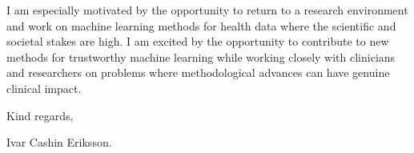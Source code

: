 \documentclass[11pt,a4paper]{moderncv}
\begin{document}
\hspace*{2em}
I am especially motivated by the opportunity to return to a research environment and work on machine learning methods for health data where the scientific and societal stakes are high. I am excited by the opportunity to contribute to new methods for trustworthy machine learning while working closely with clinicians and researchers on problems where methodological advances can have genuine clinical impact.

\vspace*{1em}
Kind regards,

\vspace*{1em}
Ivar Cashin Eriksson.
\end{document}
